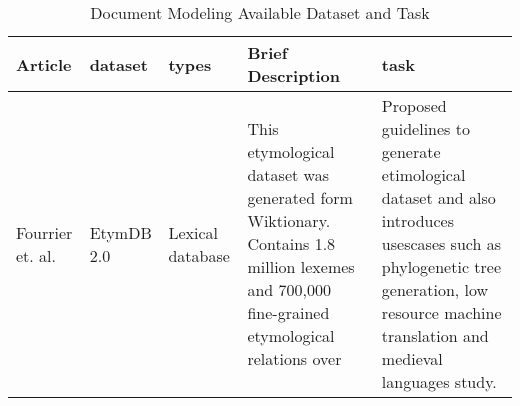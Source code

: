 \begin{longtable}
    {|p{2cm}|p{2cm}|p{2cm}|p{4cm}|p{4cm}|}
    \caption{Document Modeling Available Dataset and Task}
    \label{tab:datasets_task}                                                                                                                                                                                                                                                                                                                                                                                                                                                                                                                                                                                                                                                 \\\hline
    Article                                              & dataset                                                                                                           & types                                                                                         & Brief Description                                                                                                                                                                                                         & task                                                                                                                                                               \\ \hline
    Fourrier et. al. \cite{fourrier_methodological_2020} & EtymDB 2.0                                                                                                        & Lexical database                                                                              & This etymological dataset was generated form Wiktionary. Contains 1.8 million lexemes and 700,000 fine-grained etymological relations over                                                                                & Proposed guidelines to generate etimological dataset and also introduces usescases such as phylogenetic tree generation, low resource
    machine translation and medieval languages study.                                                                                                                                                                                                                                                                                                                                                                                                                                                                                                                                                                                                                         \\ \hline

\end{longtable}
